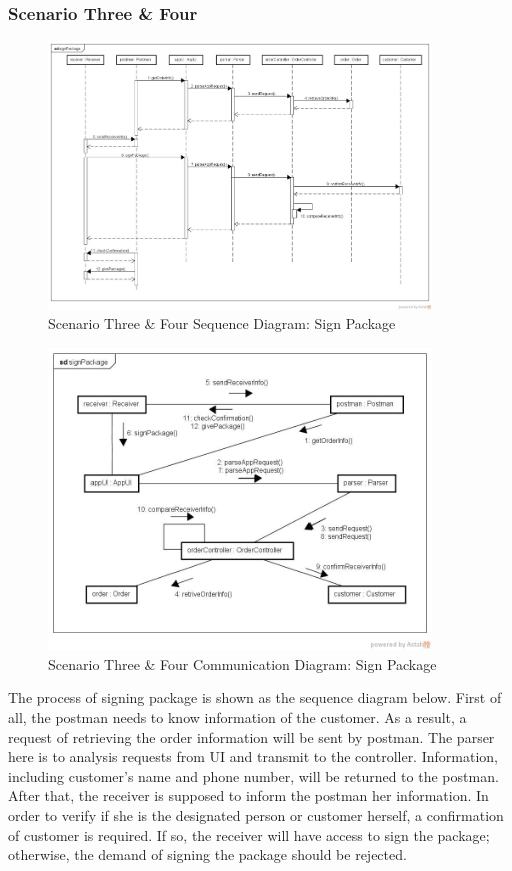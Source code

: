 \documentclass[12pt]{scrreprt}
\begin{document}
\subsubsection{Scenario Three \& Four}
\begin{figure}[H]
  \centering\includegraphics[width=4in]{DocumentRes/34SequenceDiagram_signPackage.png}
  \caption{Scenario Three \& Four Sequence Diagram: Sign Package}
\end{figure}
\begin{figure}[H]
  \centering\includegraphics[width=4in]{DocumentRes/34CommunicationDiagram_signPackage.png}
  \caption{Scenario Three \& Four Communication Diagram: Sign Package}
\end{figure}
The process of signing package is shown as the sequence diagram below. First of
all, the postman needs to know information of the customer. As a result, a
request of retrieving the order information will be sent by postman. The parser
here is to analysis requests from UI and transmit to the controller.
Information, including customer's name and phone number, will be returned
to the postman. After that, the receiver is supposed to inform the postman
her information. In order to verify if she is the designated person or customer
herself, a confirmation of customer is required. If so, the receiver will have
access to sign the package; otherwise, the demand of signing the package should
be rejected.
\end{document}
